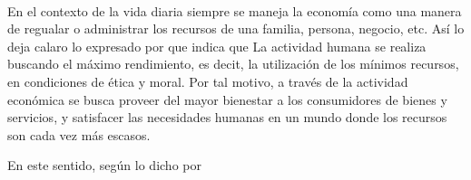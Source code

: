 
\justify
\fontsize{12pt}{14}\
\setlength{\parindent}{0cm}

\normalsize En el contexto de la vida diaria siempre se maneja la economía como una manera de regualar o administrar los recursos de una familia, persona, negocio, etc. Así lo deja calaro lo expresado por \cite{pereira2011} que indica que La actividad humana se realiza buscando el máximo rendimiento, es decit, la utilización de los mínimos recursos, en condiciones de ética y moral. Por tal motivo, a través de la actividad económica se busca proveer del mayor bienestar a los consumidores de bienes y servicios, y satisfacer las necesidades humanas en un mundo donde los recursos son cada vez más escasos.

\normalsize En este sentido, según lo dicho por \cite{llorca2016}
